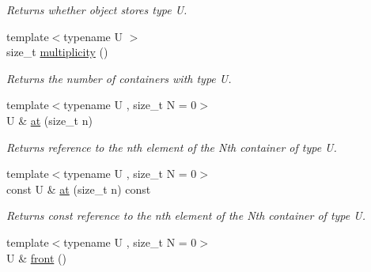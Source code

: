 \begin{DoxyCompactItemize}
\begin{DoxyCompactList}\small\item\em Returns whether object stores type U. \end{DoxyCompactList}\item 
\hypertarget{classheterogeneous_1_1heterovector_3_01_t_00_01_types_8_8_8_4_a1f1b4c1c2d85e2c860724d3011480ba8}{}{\footnotesize template$<$typename U $>$ }\\size\+\_\+t \hyperlink{classheterogeneous_1_1heterovector_3_01_t_00_01_types_8_8_8_4_a1f1b4c1c2d85e2c860724d3011480ba8}{multiplicity} ()\label{classheterogeneous_1_1heterovector_3_01_t_00_01_types_8_8_8_4_a1f1b4c1c2d85e2c860724d3011480ba8}

\begin{DoxyCompactList}\small\item\em Returns the number of containers with type U. \end{DoxyCompactList}\item 
\hypertarget{classheterogeneous_1_1heterovector_3_01_t_00_01_types_8_8_8_4_a6b2715d99eb2c666db1e330394defb69}{}{\footnotesize template$<$typename U , size\+\_\+t N = 0$>$ }\\U \& \hyperlink{classheterogeneous_1_1heterovector_3_01_t_00_01_types_8_8_8_4_a6b2715d99eb2c666db1e330394defb69}{at} (size\+\_\+t n)\label{classheterogeneous_1_1heterovector_3_01_t_00_01_types_8_8_8_4_a6b2715d99eb2c666db1e330394defb69}

\begin{DoxyCompactList}\small\item\em Returns reference to the nth element of the Nth container of type U. \end{DoxyCompactList}\item 
\hypertarget{classheterogeneous_1_1heterovector_3_01_t_00_01_types_8_8_8_4_af7ae098622d99fdac23d52aa0ae90ee8}{}{\footnotesize template$<$typename U , size\+\_\+t N = 0$>$ }\\const U \& \hyperlink{classheterogeneous_1_1heterovector_3_01_t_00_01_types_8_8_8_4_af7ae098622d99fdac23d52aa0ae90ee8}{at} (size\+\_\+t n) const \label{classheterogeneous_1_1heterovector_3_01_t_00_01_types_8_8_8_4_af7ae098622d99fdac23d52aa0ae90ee8}

\begin{DoxyCompactList}\small\item\em Returns const reference to the nth element of the Nth container of type U. \end{DoxyCompactList}\item 
\hypertarget{classheterogeneous_1_1heterovector_3_01_t_00_01_types_8_8_8_4_a112b4978960edab8dbb3e98b427505dc}{}{\footnotesize template$<$typename U , size\+\_\+t N = 0$>$ }\\U \& \hyperlink{classheterogeneous_1_1heterovector_3_01_t_00_01_types_8_8_8_4_a112b4978960edab8dbb3e98b427505dc}{front} ()\label{classheterogeneous_1_1heterovector_3_01_t_00_01_types_8_8_8_4_a112b4978960edab8dbb3e98b427505dc}


\end{DoxyCompactItemize}
